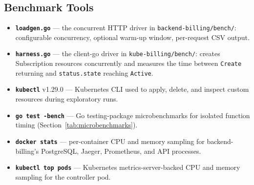 \subsection{Benchmark Tools}

\begin{itemize}
    \item \textbf{\texttt{loadgen.go}} --- the concurrent HTTP driver in \texttt{backend-billing/bench/}: configurable concurrency, optional warm-up window, per-request CSV output.
    \item \textbf{\texttt{harness.go}} --- the client-go driver in \texttt{kube-billing/bench/}: creates Subscription resources concurrently and measures the time between \texttt{Create} returning and \texttt{status.state} reaching \texttt{Active}.
    \item \textbf{\texttt{kubectl}} v1.29.0 --- Kubernetes CLI used to apply, delete, and inspect custom resources during exploratory runs.
    \item \textbf{\texttt{go test -bench}} --- Go testing-package microbenchmarks for isolated function timing (Section~\ref{tab:microbenchmarks}).
    \item \textbf{\texttt{docker stats}} --- per-container CPU and memory sampling for backend-billing's PostgreSQL, Jaeger, Prometheus, and API processes.
    \item \textbf{\texttt{kubectl top pods}} --- Kubernetes metrics-server-backed CPU and memory sampling for the controller pod.
\end{itemize}

